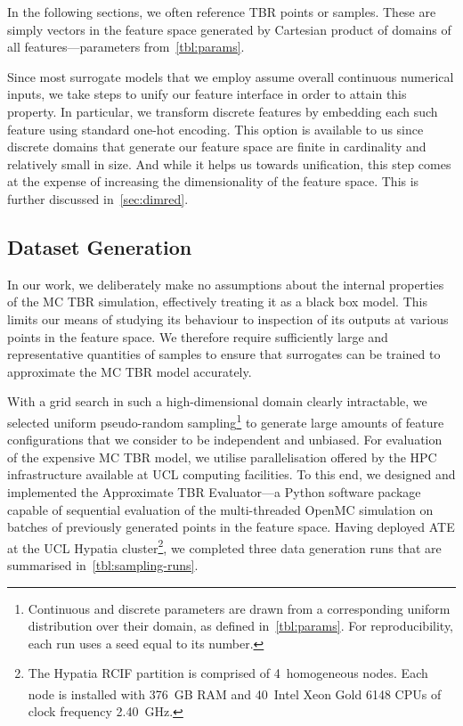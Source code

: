 In the following sections, we often reference TBR points or samples. These are simply vectors
in the feature space generated by Cartesian product of domains of all
features---parameters from~\cref{tbl:params}.

Since most surrogate models
that we employ assume overall continuous numerical inputs, we take steps to unify our
feature interface in order to attain this property. In particular, we transform
discrete features by embedding each such feature using standard one-hot
encoding. This option is available to
us since discrete domains that generate our feature space are finite in
cardinality and relatively small in size. And while it helps us towards
unification, this step comes at the expense of increasing the dimensionality of the
feature space. This is further discussed in~\cref{sec:dimred}.


\subsection{Dataset Generation}
\label{sec:dataset-generation}

In our work, we deliberately make no assumptions about the internal properties of the
MC TBR simulation, effectively treating it as a black box model. This limits our
means of studying its behaviour to inspection of its outputs at various
points in the feature space. We therefore require
sufficiently large and representative quantities of samples to ensure that
surrogates can be trained to approximate the MC TBR model accurately.

With a grid search in such a high-dimensional domain clearly intractable, we
selected uniform pseudo-random sampling\footnote{Continuous and discrete
parameters are drawn from a corresponding uniform distribution over their
domain, as defined in~\cref{tbl:params}. For reproducibility, each run uses a seed equal to its number.} to generate large amounts of feature
configurations that we consider to be independent and unbiased. For evaluation
of the expensive MC TBR model, we utilise parallelisation offered by
the HPC infrastructure available at UCL computing facilities. To this end, we
designed and implemented the Approximate TBR Evaluator---a Python software package capable of
sequential evaluation of the multi-threaded OpenMC simulation on batches of
previously generated points in the feature space.
Having deployed ATE at the UCL Hypatia cluster\footnote{The Hypatia RCIF
	partition is comprised of 4~homogeneous nodes. Each node is installed with
	376~GB RAM and 40~Intel\textsuperscript{\textregistered}
	Xeon\textsuperscript{\textregistered} Gold 6148 CPUs of clock frequency
	2.40~GHz.}, we completed three data
generation runs that are summarised in~\cref{tbl:sampling-runs}.

